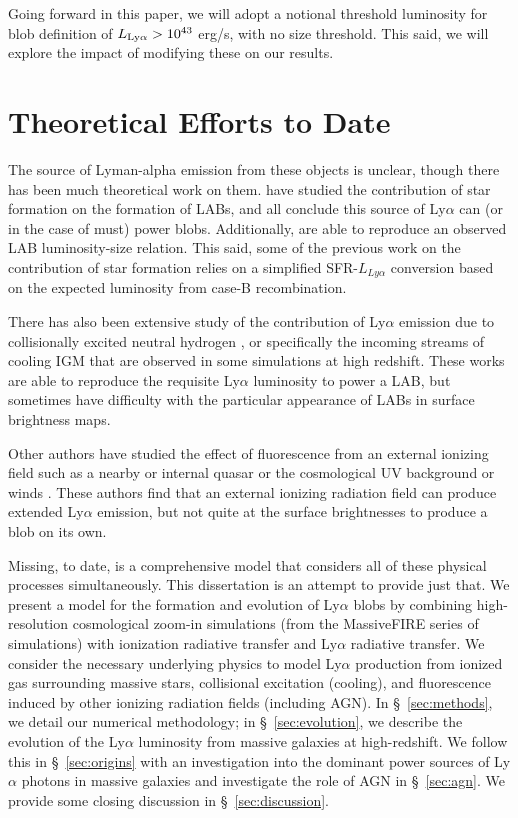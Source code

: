 Going forward in this paper, we will adopt a notional threshold luminosity for blob definition of $L_{\rm Ly\alpha} > 10^{43}$ erg/s, with no size threshold.
This said, we will explore the impact of modifying these on our results.

\section{Theoretical Efforts to Date}

The source of Lyman-alpha emission from these objects is unclear, though there has been much theoretical work on them. \citet{Furlanetto2005, Laursen2007, Cen2013, Geach2016, Gronke2017} have studied the contribution of star formation on the formation of LABs, and all conclude this source of Ly$\alpha$ can (or in the case of \citet{Cen2013} must) power blobs.
Additionally, \citet{Cen2013} are able to reproduce an observed LAB luminosity-size relation.
This said, some of the previous work on the contribution of star formation relies on a simplified SFR-$L_{Ly\alpha}$ conversion based on the expected luminosity from case-B recombination.

There has also been extensive study of the contribution of Ly$\alpha$ emission due to collisionally excited neutral hydrogen \citep{Rosdahl2012, Fardal2001, Goerdt2010, Haiman2000, Faucher-Giguere2010}, or specifically the incoming streams of cooling IGM that are observed in some simulations at high redshift.
These works are able to reproduce the requisite Ly$\alpha$ luminosity to power a LAB, but sometimes have difficulty with the particular appearance of LABs in surface brightness maps.

Other authors have studied the effect of fluorescence from an external ionizing field such as a nearby or internal quasar \citep{Haiman2001} or the cosmological UV background or winds \citep{Furlanetto2005, Mas-Ribas2016}.
These authors find that an external ionizing radiation field can produce extended Ly$\alpha$ emission, but not quite at the surface brightnesses to produce a blob on its own.

Missing, to date, is a comprehensive model that considers all of these physical processes simultaneously.
This dissertation is an attempt to provide just that.
We present a model for the formation and evolution of Ly$\alpha$ blobs by combining high-resolution cosmological zoom-in simulations (from the MassiveFIRE series of simulations) with ionization radiative transfer and Ly$\alpha$ radiative transfer.
We consider the necessary underlying physics to model Ly$\alpha$ production from ionized gas surrounding massive stars, collisional excitation (cooling), and fluorescence induced by other ionizing radiation fields (including AGN).
In \S~\ref{sec:methods}, we detail our numerical methodology; in \S~\ref{sec:evolution}, we describe the evolution of the Ly$\alpha$ luminosity from massive galaxies at high-redshift.
We follow this in \S~\ref{sec:origins} with an investigation into the dominant power sources of Ly$\alpha$ photons in massive galaxies and investigate the role of AGN in \S~\ref{sec:agn}.
We provide some closing discussion in \S~\ref{sec:discussion}.

